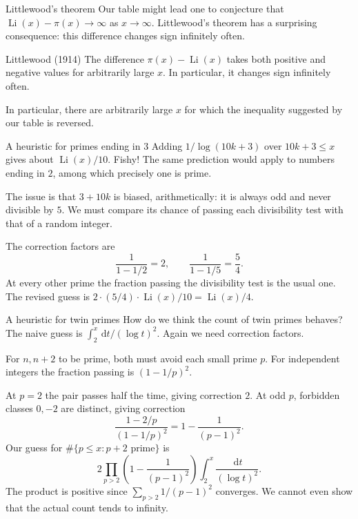 \documentclass[aspectratio=169,11pt]{beamer}
\newcommand{\dd}{\,\mathrm d}
\begin{document}
\begin{frame}{Littlewood's theorem}
Our table might lead one to conjecture that $\operatorname{Li}(x)-\pi(x)\to\infty$ as $x\to\infty$. Littlewood's theorem has a surprising consequence: this difference changes sign infinitely often.
\begin{block}{Littlewood (1914)}
The difference $\pi(x)-\operatorname{Li}(x)$ takes both positive and negative values for arbitrarily large $x$. In particular, it changes sign infinitely often.
\end{block}
In particular, there are arbitrarily large $x$ for which the inequality suggested by our table is reversed.
\end{frame}
\begin{frame}{A heuristic for primes ending in 3}
Adding $1/\log(10k+3)$ over $10k+3\le x$ gives about $\operatorname{Li}(x)/10$. Fishy! The same prediction would apply to numbers ending in $2$, among which precisely one is prime.

The issue is that $3+10k$ is biased, arithmetically: it is always odd and never divisible by $5$. We must compare its chance of passing each divisibility test with that of a random integer.

The correction factors are
\[\frac1{1-1/2}=2,\qquad\frac1{1-1/5}=\frac54.\]
At every other prime the fraction passing the divisibility test is the usual one. The revised guess is $2\cdot(5/4)\cdot\operatorname{Li}(x)/10=\operatorname{Li}(x)/4$.
\end{frame}
\begin{frame}{A heuristic for twin primes}
How do we think the count of twin primes behaves? The naive guess is $\int_2^x\dd t/(\log t)^2$. Again we need correction factors.

For $n,n+2$ to be prime, both must avoid each small prime $p$. For independent integers the fraction passing is $(1-1/p)^2$.

At $p=2$ the pair passes half the time, giving correction $2$. At odd $p$, forbidden classes $0,-2$ are distinct, giving correction
\[\frac{1-2/p}{(1-1/p)^2}=1-\frac1{(p-1)^2}.\]
Our guess for $\#\{p\le x:p+2\text{ prime}\}$ is
\[2\prod_{p>2}\left(1-\frac1{(p-1)^2}\right)\int_2^x\frac{\dd t}{(\log t)^2}.\]
The product is positive since $\sum_{p>2}1/(p-1)^2$ converges. We cannot even show that the actual count tends to infinity.
\end{frame}
\end{document}
